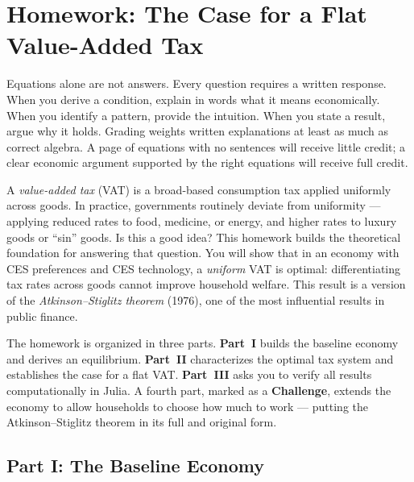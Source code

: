 \chapter{Homework: The Case for a Flat Value-Added Tax}
\label{chap:hw-ramsey}
 
\begin{calloutimportant}
Equations alone are not answers. Every question requires a written response. When you derive a condition, explain in words what it means economically. When you identify a pattern, provide the intuition. When you state a result, argue why it holds. Grading weights written explanations at least as much as correct algebra. A page of equations with no sentences will receive little credit; a clear economic argument supported by the right equations will receive full credit.
\end{calloutimportant}
 
\begin{calloutnote}
A \emph{value-added tax} (VAT) is a broad-based consumption tax applied uniformly across goods. In practice, governments routinely deviate from uniformity --- applying reduced rates to food, medicine, or energy, and higher rates to luxury goods or ``sin'' goods. Is this a good idea? This homework builds the theoretical foundation for answering that question. You will show that in an economy with CES preferences and CES technology, a \emph{uniform} VAT is optimal: differentiating tax rates across goods cannot improve household welfare. This result is a version of the \emph{Atkinson--Stiglitz theorem} (1976), one of the most influential results in public finance.
 
The homework is organized in three parts. \textbf{Part~I} builds the baseline economy and derives an equilibrium. \textbf{Part~II} characterizes the optimal tax system and establishes the case for a flat VAT. \textbf{Part~III} asks you to verify all results computationally in Julia. A fourth part, marked as a \textbf{Challenge}, extends the economy to allow households to choose how much to work --- putting the Atkinson--Stiglitz theorem in its full and original form.
\end{calloutnote}
 
\section{Part I: The Baseline Economy}
\label{sec:baseline}
 

